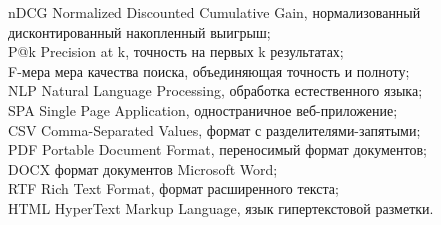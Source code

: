 \begin{flushleft}
	\indent nDCG \mdash Normalized Discounted Cumulative Gain, нормализованный дисконтированный накопленный выигрыш;\\
	\indent P@k \mdash Precision at k, точность на первых k результатах;\\
	\indent F-мера \mdash мера качества поиска, объединяющая точность и полноту;\\
	\indent NLP \mdash Natural Language Processing, обработка естественного языка;\\
	\indent SPA \mdash Single Page Application, одностраничное веб-приложение;\\
	\indent CSV \mdash Comma-Separated Values, формат с разделителями-запятыми;\\
	\indent PDF \mdash Portable Document Format, переносимый формат документов;\\
	\indent DOCX \mdash формат документов Microsoft Word;\\
	\indent RTF \mdash Rich Text Format, формат расширенного текста;\\
	\indent HTML \mdash HyperText Markup Language, язык гипертекстовой разметки.
\end{flushleft}
